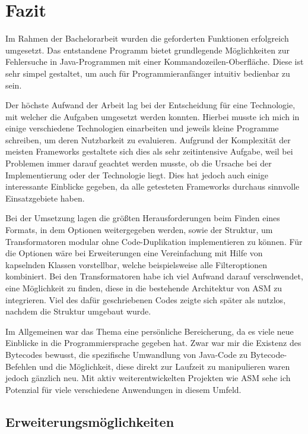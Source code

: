 
\chapter{Fazit}

Im Rahmen der Bachelorarbeit wurden die geforderten Funktionen erfolgreich umgesetzt. Das entstandene Programm bietet grundlegende Möglichkeiten zur Fehlersuche in Java-Programmen mit einer Kommandozeilen-Oberfläche. Diese ist sehr simpel gestaltet, um auch für Programmieranfänger intuitiv bedienbar zu sein.

Der höchste Aufwand der Arbeit lag bei der Entscheidung für eine Technologie, mit welcher die Aufgaben umgesetzt werden konnten. Hierbei musste ich mich in einige verschiedene Technologien einarbeiten und jeweils kleine Programme schreiben, um deren Nutzbarkeit zu evaluieren. Aufgrund der Komplexität der meisten Frameworks gestaltete sich dies als sehr zeitintensive Aufgabe, weil bei Problemen immer darauf geachtet werden musste, ob die Ursache bei der Implementierung oder der Technologie liegt. Dies hat jedoch auch einige interessante Einblicke gegeben, da alle getesteten Frameworks durchaus sinnvolle Einsatzgebiete haben.

Bei der Umsetzung lagen die größten Herausforderungen beim Finden eines Formats, in dem Optionen weitergegeben werden, sowie der Struktur, um Transformatoren modular ohne Code-Duplikation implementieren zu können. Für die Optionen wäre bei Erweiterungen eine Vereinfachung mit Hilfe von kapselnden Klassen vorstellbar, welche beispielsweise alle Filteroptionen kombiniert. Bei den Transformatoren habe ich viel Aufwand darauf verschwendet, eine Möglichkeit zu finden, diese in die bestehende Architektur von ASM zu integrieren. Viel des dafür geschriebenen Codes zeigte sich später als nutzlos, nachdem die Struktur umgebaut wurde.

Im Allgemeinen war das Thema eine persönliche Bereicherung, da es viele neue Einblicke in die Programmiersprache gegeben hat. Zwar war mir die Existenz des Bytecodes bewusst, die spezifische Umwandlung von Java-Code zu Bytecode-Befehlen und die Möglichkeit, diese direkt zur Laufzeit zu manipulieren waren jedoch gänzlich neu. Mit aktiv weiterentwickelten Projekten wie ASM sehe ich Potenzial für viele verschiedene Anwendungen in diesem Umfeld.

\section{Erweiterungsmöglichkeiten} 


